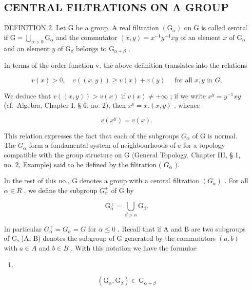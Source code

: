 \subsection{CENTRAL FILTRATIONS ON A GROUP}

DEFINITION 2. Let G be a group. A real filtration \((\mathrm{G}_{\alpha})\) on G is called central if \(\mathrm{G} = \bigcup_{\alpha >0}\mathrm{G}_{\alpha}\) and the commutator \((x,y) = x^{-1}y^{-1}xy\) of an element \(x\) of \(\mathrm{G}_{\alpha}\) and an element \(y\) of \(\mathrm{G}_{\beta}\) belongs to \(\mathrm{G}_{\alpha +\beta}\) .

In terms of the order function v, the above definition translates into the relations

\[
v (x) > 0, \quad v ((x, y)) \geqslant v (x) + v (y) \quad \text { for   all } x, y \text { in } G.\tag{10}
\]

We deduce that \(v((x,y)) > v(x)\) if \(v(x) \neq +\infty\) ; if we write \(x^y = y^{-1}xy\) (cf.~Algebra, Chapter I, § 6, no. 2), then \(x^y = x.(x,y)\) , whence

\[
v (x ^ {y}) = v (x).\tag{11}
\]

This relation expresses the fact that each of the subgroups \(G_{\alpha}\) of G is normal. The \(G_{\alpha}\) form a fundamental system of neighbourhoods of e for a topology compatible with the group structure on G (General Topology, Chapter III, § 1, no. 2, Example) said to be defined by the filtration ( \(G_{\alpha}\) ).

In the rest of this no., G denotes a group with a central filtration \((G_{\alpha})\) . For all \(\alpha \in R\) , we define the subgroup \(G_{\alpha}^{+}\) of G by

\[
\mathrm{G} _ {\alpha} ^ {+} = \bigcup_ {\beta > \alpha} \mathrm{G} _ {\beta}.\tag{12}
\]

In particular \(G_{\alpha}^{+} = G_{\alpha} = G\) for \(\alpha \leqslant 0\) . Recall that if A and B are two subgroups of G, (A, B) denotes the subgroup of G generated by the commutators \((a, b)\) with \(a \in A\) and \(b \in B\) . With this notation we have the formulae

\begin{enumerate}
\def\labelenumi{(\arabic{enumi})}
\setcounter{enumi}{12}
\tightlist
\item
\end{enumerate}

\[
\left(\mathrm{G} _ {\alpha}, \mathrm{G} _ {\beta}\right) \subset \mathrm{G} _ {\alpha + \beta}\tag{13}
\]

